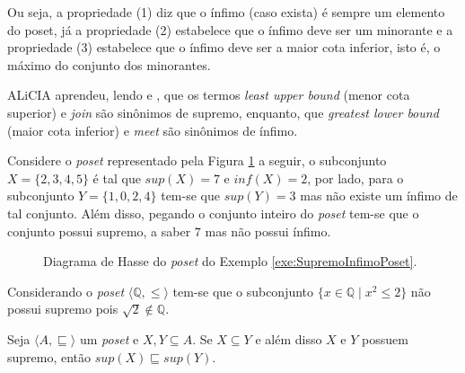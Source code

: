 Ou seja, a propriedade (1) diz que o ínfimo (caso exista) é sempre um elemento do poset, já a propriedade (2) estabelece que o  ínfimo deve ser um minorante e a propriedade (3) estabelece que o  ínfimo deve ser a maior cota inferior, isto é, o máximo do conjunto dos minorantes.

\begin{nota}
  ALiCIA aprendeu, lendo \cite{carmo2013} e \cite{fmcbook}, que os termos \textit{least upper bound} (menor cota superior) e \textit{join} são sinônimos de supremo, enquanto, que \textit{greatest lower bound} (maior cota inferior) e \textit{meet} são sinônimos de ínfimo.
\end{nota}

\begin{exemplo}\label{exe:SupremoInfimoPoset}
	Considere o \textit{poset} representado pela Figura \ref{fig:DiagramaHasse10} a seguir, o subconjunto $X = \{2, 3, 4, 5\}$ é tal que $sup(X) = 7$ e $inf(X) = 2$, por lado, para o subconjunto $Y = \{1, 0, 2, 4\}$ tem-se que $sup(Y) = 3$ mas não existe um ínfimo de tal conjunto. Além disso, pegando o conjunto inteiro do \textit{poset} tem-se que o conjunto possui supremo, a saber $7$ mas não possui ínfimo. 
\end{exemplo}

\begin{figure}[h]
  \centering
  \caption{Diagrama de Hasse do \textit{poset} do Exemplo \ref{exe:SupremoInfimoPoset}.}
  \label{fig:DiagramaHasse10}
\end{figure}

\begin{exemplo}
  Considerando o \textit{poset} $\langle \mathbb{Q}, \leq \rangle$ tem-se que o subconjunto $\{x \in \mathbb{Q} \mid x^2 \leq 2\}$ não possui supremo pois $\sqrt{2} \notin \mathbb{Q}$.
\end{exemplo}

\begin{teorema}
	Seja $\langle A, \sqsubseteq \rangle$ um \textit{poset} e $X, Y \subseteq A$. Se $X \subseteq Y$ e além disso $X$ e $Y$ possuem supremo, então $sup(X) \sqsubseteq sup(Y)$.
\end{teorema}

